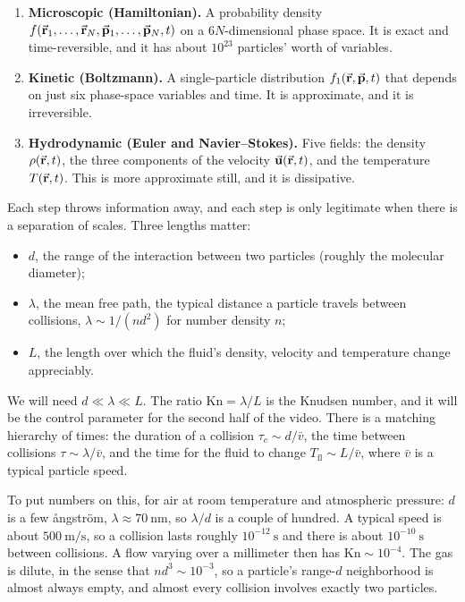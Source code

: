 \begin{enumerate}
  \item \textbf{Microscopic (Hamiltonian).} A probability density $f(\va r_1,\dots,\va r_N,\va p_1,\dots,\va p_N,t)$ on a $6N$-dimensional phase space. It is exact and time-reversible, and it has about $10^{23}$ particles' worth of variables.
  \item \textbf{Kinetic (Boltzmann).} A single-particle distribution $f_1(\va r,\va p,t)$ that depends on just six phase-space variables and time. It is approximate, and it is irreversible.
  \item \textbf{Hydrodynamic (Euler and Navier--Stokes).} Five fields: the density $\rho(\va r,t)$, the three components of the velocity $\va u(\va r,t)$, and the temperature $T(\va r,t)$. This is more approximate still, and it is dissipative.
\end{enumerate}

Each step throws information away, and each step is only legitimate when there is a separation of scales. Three lengths matter:
\begin{itemize}
  \item $d$, the range of the interaction between two particles (roughly the molecular diameter);
  \item $\lambda$, the mean free path, the typical distance a particle travels between collisions, $\lambda \sim 1/(n d^2)$ for number density $n$;
  \item $L$, the length over which the fluid's density, velocity and temperature change appreciably.
\end{itemize}
We will need $d \ll \lambda \ll L$. The ratio $\mathrm{Kn} = \lambda/L$ is the Knudsen number, and it will be the control parameter for the second half of the video. There is a matching hierarchy of times: the duration of a collision $\tau_c \sim d/\bar v$, the time between collisions $\tau \sim \lambda/\bar v$, and the time for the fluid to change $T_{\mathrm{fl}} \sim L/\bar v$, where $\bar v$ is a typical particle speed.

To put numbers on this, for air at room temperature and atmospheric pressure: $d$ is a few ångström, $\lambda \approx 70\ \mathrm{nm}$, so $\lambda/d$ is a couple of hundred. A typical speed is about $500\ \mathrm{m/s}$, so a collision lasts roughly $10^{-12}\ \mathrm{s}$ and there is about $10^{-10}\ \mathrm{s}$ between collisions. A flow varying over a millimeter then has $\mathrm{Kn}\sim 10^{-4}$. The gas is dilute, in the sense that $n d^3 \sim 10^{-3}$, so a particle's range-$d$ neighborhood is almost always empty, and almost every collision involves exactly two particles.

